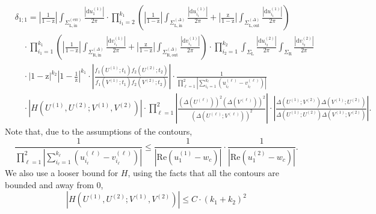 \documentclass{article}
\numberwithin{equation}{section}
\newcommand{\exe}{\mathrm{err}}
\newcommand{\inn}{\mathrm{in}}
\newcommand{\LL}{\mathrm{L}}
\newcommand{\out}{\mathrm{out}}
\newcommand{\RR}{\mathrm{R}}
\begin{document}
	\begin{equation}
		\label{eq:aux_25}
		\begin{split}
			&\delta_{1;1}=\left|\frac{1}{1-\mathrm{z}}\right| \int_{\Sigma_{\LL,\inn}^{(\exe)}} 	    
			\frac{|\mathrm{d}u^{(1)}_{1}|}{2\pi}  \cdot			
			\prod_{i_1=2}^{k_1}     
			\left(  \left|\frac{1}{1-\mathrm{z}}\right| \int_{\Sigma_{\LL,\inn}^{(\Delta)}} 	    
			\frac{|\mathrm{d}u^{(1)}_{i_1}|}{2\pi}   
			+\left|\frac{\mathrm{z}}{1-\mathrm{z}}\right| \int_{\Sigma_{\LL,\out}^{(\Delta)}} \frac{|\mathrm{d}u^{(1)}_{i_1}|}{2\pi}   
			\right)\\
			&\quad \cdot	\prod_{i_1=1}^{k_1}
			\left(  \left|\frac{1}{1-\mathrm{z}}\right| \int_{\Sigma_{\RR,\inn}^{(\Delta)}} 	    
			\frac{|\mathrm{d}v^{(1)}_{i_1}|}{2\pi}   
			+\left|\frac{\mathrm{z}}{1-\mathrm{z}}\right| \int_{\Sigma_{\RR,\out}^{(\Delta)}} \frac{|\mathrm{d}v^{(1)}_{i_1}|}{2\pi}   
			\right)\cdot 
			\prod_{i_2=1}^{k_2}  
			\int_{\Sigma_\LL} \frac{|\mathrm{d}u^{(2)}_{i_2}|}{2\pi}   
			\int_{\Sigma_\RR} \frac{|\mathrm{d}v^{(2)}_{i_2}|}{2\pi}  \\
			&\quad
			\cdot    
			\left|1-\mathrm{z}\right|^{k_2}
			\left|1-\frac{1}{\mathrm{z}}\right|^{k_1}
			\cdot 
			\left|\frac{f_1(U^{(1)};t_1)f_2(U^{(2)};t_2)}{f_1(V^{(1)};t_1)f_2(V^{(2)};t_2)}\right|
			\cdot \frac{1}{\prod_{\ell=1}^2\left|\sum_{i_\ell=1}^{k_\ell}(u_{i_\ell}^{(\ell)} -v_{i_\ell}^{(\ell)})\right|}
			\\
			&\quad \cdot \left| H(U^{(1)},U^{(2)};V^{(1)},V^{(2)})\right|\cdot 
			\prod_{\ell=1}^2
			\left|\frac{\left( \Delta(U^{(\ell)}) \right)^2
				\left( \Delta(V^{(\ell)}) \right)^2
			}
			{\left( \Delta(U^{(\ell)}; V^{(\ell)}) \right)^2}\right|
			\cdot 
			\left|\frac{\Delta(U^{(1)};V^{(2)})\Delta(V^{(1)};U^{(2)})}
			{\Delta(U^{(1)};U^{(2)})\Delta(V^{(1)};V^{(2)})}\right|.	
		\end{split}
	\end{equation}
 Note that, due to the assumptions of the contours,
\begin{equation*}
	\frac{1}{\prod_{\ell=1}^2\left|\sum_{i_\ell=1}^{k_\ell}(u_{i_\ell}^{(\ell)} -v_{i_\ell}^{(\ell)})\right|}\le \frac{1}{|\mathrm{Re}(u_1^{(1)}-w_c)|}\cdot\frac{1}{|\mathrm{Re}(u_1^{(2)}-w_c)|}.
\end{equation*}
We also use a looser bound for $H$, using the facts that all the contours are bounded and away from $0$,
\begin{equation*}
	\left| H(U^{(1)},U^{(2)};V^{(1)},V^{(2)})\right| \le C\cdot (k_1+k_2)^2
\end{equation*}
\end{document}
